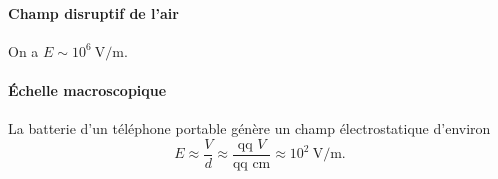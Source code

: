         \paragraph{Champ disruptif de l'air}

            On a $E\sim 10^{6}~\si{\volt\per\metre}$.

        \paragraph{Échelle macroscopique}

            La batterie d'un téléphone portable génère un champ électrostatique d'environ
            \begin{equation*}
                E\approx \frac{V}{d}\approx \frac{\text{qq } V}{\text{qq } \si{\centi\metre}}\approx10^{2}~\si{\volt\per\metre}.
            \end{equation*}